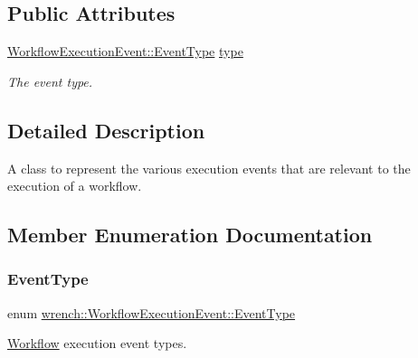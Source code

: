 \subsection*{Public Attributes}
\begin{DoxyCompactItemize}
\item 
\mbox{\label{classwrench_1_1_workflow_execution_event_ace095d03737f181e628babdd4ee0e851}} 
\hyperlink{classwrench_1_1_workflow_execution_event_a5611165191fbc4d121d1b141c748a448}{Workflow\+Execution\+Event\+::\+Event\+Type} \hyperlink{classwrench_1_1_workflow_execution_event_ace095d03737f181e628babdd4ee0e851}{type}
\begin{DoxyCompactList}\small\item\em The event type. \end{DoxyCompactList}\end{DoxyCompactItemize}


\subsection{Detailed Description}
A class to represent the various execution events that are relevant to the execution of a workflow. 

\subsection{Member Enumeration Documentation}
\mbox{\label{classwrench_1_1_workflow_execution_event_a5611165191fbc4d121d1b141c748a448}} 
\subsubsection{\texorpdfstring{Event\+Type}{EventType}}
{\footnotesize\ttfamily enum \hyperlink{classwrench_1_1_workflow_execution_event_a5611165191fbc4d121d1b141c748a448}{wrench\+::\+Workflow\+Execution\+Event\+::\+Event\+Type}}



\hyperlink{classwrench_1_1_workflow}{Workflow} execution event types. 

